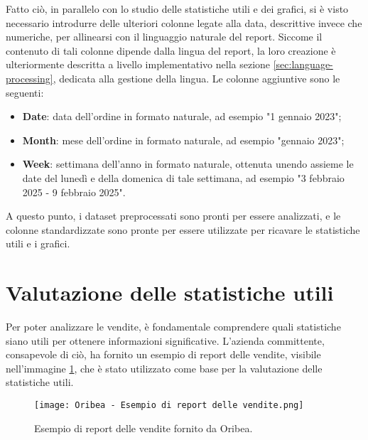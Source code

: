 Fatto ciò, in parallelo con lo studio delle statistiche utili e dei grafici, si è visto necessario introdurre delle ulteriori colonne legate alla data, descrittive invece che numeriche, per allinearsi con il linguaggio naturale del report. Siccome il contenuto di tali colonne dipende dalla lingua del report, la loro creazione è ulteriormente descritta a livello implementativo nella sezione \ref{sec:language-processing}, dedicata alla gestione della lingua. Le colonne aggiuntive sono le seguenti:
\begin{itemize}
    \item \textbf{Date}: data dell'ordine in formato naturale, ad esempio "1 gennaio 2023";
    \item \textbf{Month}: mese dell'ordine in formato naturale, ad esempio "gennaio 2023";
    \item \textbf{Week}: settimana dell'anno in formato naturale, ottenuta unendo assieme le date del lunedì e della domenica di tale settimana, ad esempio "3 febbraio 2025 - 9 febbraio 2025".
\end{itemize}

A questo punto, i dataset preprocessati sono pronti per essere analizzati, e le colonne standardizzate sono pronte per essere utilizzate per ricavare le statistiche utili e i grafici.



\section{Valutazione delle statistiche utili}

Per poter analizzare le vendite, è fondamentale comprendere quali statistiche siano utili per ottenere informazioni significative. L'azienda committente, consapevole di ciò, ha fornito un esempio di report delle vendite, visibile nell'immagine \ref{fig:oribea-report-example}, che è stato utilizzato come base per la valutazione delle statistiche utili.

\begin{figure}[!h]
    \centering
    \texttt{[image: Oribea - Esempio di report delle vendite.png]}
    \caption{Esempio di report delle vendite fornito da Oribea.}
    \label{fig:oribea-report-example}
\end{figure}

